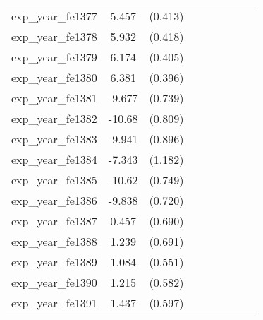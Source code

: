 {\begin{tabular}{l*{4}{cc}}
exp\_year\_fe1377&    5.457\sym{***}&  (0.413)&                  &         &                  &         &                  &         \\
exp\_year\_fe1378&    5.932\sym{***}&  (0.418)&                  &         &                  &         &                  &         \\
exp\_year\_fe1379&    6.174\sym{***}&  (0.405)&                  &         &                  &         &                  &         \\
exp\_year\_fe1380&    6.381\sym{***}&  (0.396)&                  &         &                  &         &                  &         \\
exp\_year\_fe1381&   -9.677\sym{***}&  (0.739)&                  &         &                  &         &                  &         \\
exp\_year\_fe1382&   -10.68\sym{***}&  (0.809)&                  &         &                  &         &                  &         \\
exp\_year\_fe1383&   -9.941\sym{***}&  (0.896)&                  &         &                  &         &                  &         \\
exp\_year\_fe1384&   -7.343\sym{***}&  (1.182)&                  &         &                  &         &                  &         \\
exp\_year\_fe1385&   -10.62\sym{***}&  (0.749)&                  &         &                  &         &                  &         \\
exp\_year\_fe1386&   -9.838\sym{***}&  (0.720)&                  &         &                  &         &                  &         \\
exp\_year\_fe1387&    0.457         &  (0.690)&                  &         &                  &         &                  &         \\
exp\_year\_fe1388&    1.239         &  (0.691)&                  &         &                  &         &                  &         \\
exp\_year\_fe1389&    1.084\sym{*}  &  (0.551)&                  &         &                  &         &                  &         \\
exp\_year\_fe1390&    1.215\sym{*}  &  (0.582)&                  &         &                  &         &                  &         \\
exp\_year\_fe1391&    1.437\sym{*}  &  (0.597)&                  &         &                  &         &                  &         \\

\end{tabular}}
